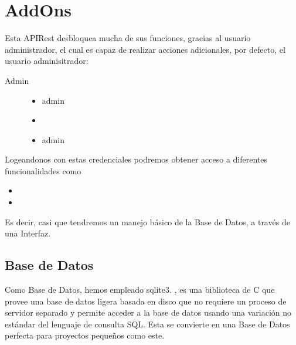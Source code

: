 \documentclass[letterpaper,10pt,spanish]{sphinxmanual}
\begin{document}
\section{Add\sphinxhyphen{}Ons}
\label{\detokenize{documentos/instalacion:add-ons}}
\sphinxAtStartPar
Esta APIRest desbloquea mucha de sus funciones, gracias al usuario administrador, el cual es capaz de realizar acciones
adicionales, por defecto, el usuario adminisitrador:
\begin{description}
\item[{Admin}] \leavevmode\begin{itemize}
\item {} 
\sphinxAtStartPar
{} admin

\item {} 
\sphinxAtStartPar
{} 

\item {} 
\sphinxAtStartPar
{} admin

\end{itemize}

\end{description}

\sphinxAtStartPar
Logeandonos con estas credenciales podremos obtener acceso a diferentes funcionalidades como
\begin{itemize}
\item {} 
\sphinxAtStartPar
{}

\item {} 
\sphinxAtStartPar
{}

\end{itemize}

\sphinxAtStartPar
Es decir, casi que tendremos un manejo básico de la Base de Datos, a través de una Interfaz.


\subsection{Base de Datos}
\label{\detokenize{documentos/instalacion:base-de-datos}}
\sphinxAtStartPar
Como Base de Datos, hemos empleado sqlite3.  , es una biblioteca de
C que provee una base de datos ligera basada en disco que no requiere un proceso de servidor separado y permite acceder
a la base de datos usando una variación no estándar del lenguaje de consulta SQL. Esta se convierte en una Base de Datos
perfecta para proyectos pequeños como este.
\end{document}
